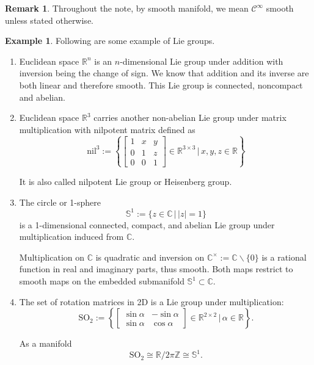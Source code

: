 \documentclass{article}
\theoremstyle{definition}
\newtheorem{example}{Example}[section]
\newtheorem{remark}{Remark}[section]
\begin{document}
\begin{remark}
  Throughout the note, by smooth manifold, we mean $\mathcal{C}^{\infty}$ smooth unless stated otherwise.
\end{remark}

\begin{example}Following are some example of Lie groups.
  \begin{enumerate}
    \item Euclidean space $\mathbb{R}^{n}$ is an $n$-dimensional Lie group under addition with inversion being the change of sign. We know that addition and its inverse are both linear and therefore smooth. This Lie group is connected, noncompact and abelian.
    \item Euclidean space $\mathbb{R}^{3}$ carries another non-abelian Lie group under matrix multiplication with nilpotent matrix defined as
    $$
    \text{nil}^{3}:=
    \left\{
      \begin{bmatrix}1&x&y\\0&1&z\\0&0&1\end{bmatrix}
      \in\mathbb{R}^{3\times3}\,\Big|\, x,y,z\in\mathbb{R}
    \right\}
    $$

    It is also called nilpotent Lie group or Heisenberg group.
  \item The circle or 1-sphere
  $$
  \mathbb{S}^{1}:=\{z\in\mathbb{C}\,|\,|z|=1\}
  $$
  is a 1-dimensional connected, compact, and abelian Lie group under multiplication induced from $\mathbb{C}$.

  Multiplication on $\mathbb{C}$ is quadratic and inversion on $\mathbb{C}^{\times}:=\mathbb{C}\backslash\{0\}$ is a rational function in real and imaginary parts, thus smooth. Both maps restrict to smooth maps on the embedded submanifold $\mathbb{S}^{1}\subset\mathbb{C}$.

  \item The set of rotation matrices in 2D is a Lie group under multiplication:
  $$
  \text{SO}_{2}:=
  \left\{
    \begin{bmatrix}\sin\alpha&-\sin\alpha\\\sin\alpha&\cos\alpha\end{bmatrix}
    \in\mathbb{R}^{2\times2}\,\Big|\,\alpha\in\mathbb{R}
  \right\}.
  $$

  As a manifold $$\text{SO}_{2}\cong\mathbb{R}/2\pi\mathbb{Z}\cong\mathbb{S}^{1}.$$
  \end{enumerate}
\end{example}
\end{document}
